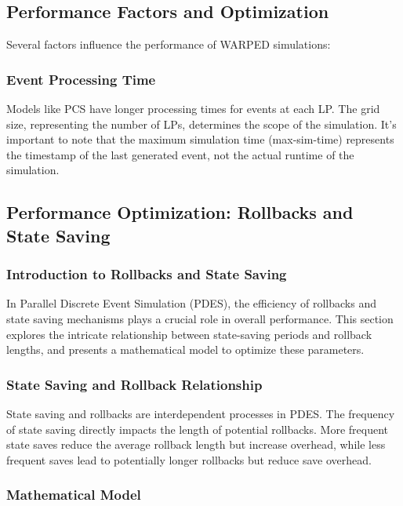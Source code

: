 \subsection{Performance Factors and Optimization}

Several factors influence the performance of WARPED simulations:

\subsubsection{Event Processing Time}

Models like PCS have longer processing times for events at each LP. The grid size, representing the number of LPs, determines the scope of the simulation. It's important to note that the maximum simulation time (max-sim-time) represents the timestamp of the last generated event, not the actual runtime of the simulation.

\subsection{Performance Optimization: Rollbacks and State Saving}

\subsubsection{Introduction to Rollbacks and State Saving}

In Parallel Discrete Event Simulation (PDES), the efficiency of rollbacks and state saving mechanisms plays a crucial role in overall performance. This section explores the intricate relationship between state-saving periods and rollback lengths, and presents a mathematical model to optimize these parameters.

\subsubsection{State Saving and Rollback Relationship}

State saving and rollbacks are interdependent processes in PDES. The frequency of state saving directly impacts the length of potential rollbacks. More frequent state saves reduce the average rollback length but increase overhead, while less frequent saves lead to potentially longer rollbacks but reduce save overhead.

\subsubsection{Mathematical Model}

